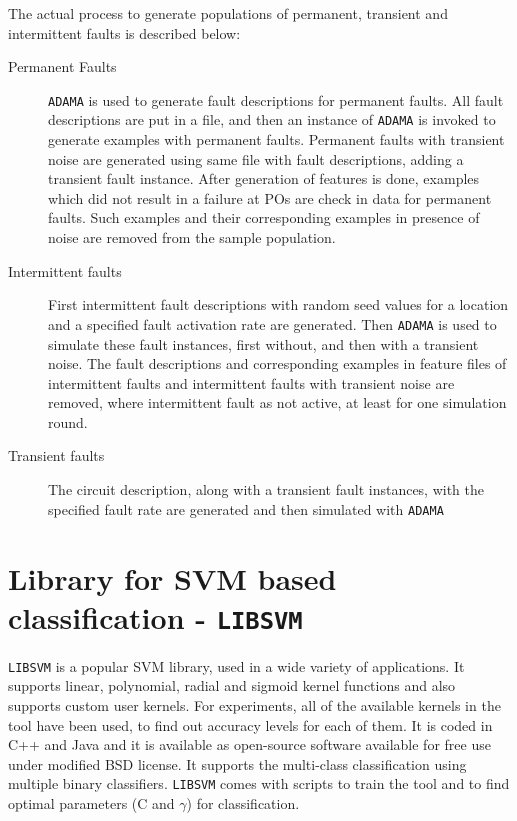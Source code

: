 The actual process to generate populations of permanent, transient and intermittent faults is described below:

\begin{description}
  \item[Permanent Faults] \texttt{ADAMA} is used to generate fault descriptions for permanent faults. All fault descriptions are put in a file, and then an instance of \texttt{ADAMA} is invoked to generate examples with permanent faults. Permanent faults with transient noise are generated using same file with fault descriptions, adding a transient fault instance. After generation of features is done, examples which did not result in a failure at POs are check in data for permanent faults. Such examples and their corresponding examples in presence of noise are removed from the sample population.

  \item[Intermittent faults] First intermittent fault descriptions with random seed values for a location and a specified fault activation rate are generated. Then \texttt{ADAMA} is used to simulate these fault instances, first without, and then with a transient noise. The fault descriptions and corresponding examples in feature files of intermittent faults and intermittent faults with transient noise are removed, where intermittent fault as not active, at least for one simulation round.

  \item[Transient faults] The circuit description, along with a transient fault instances, with the specified fault rate are generated and then simulated with \texttt{ADAMA}

\end{description}

\section{Library for SVM based classification - \texttt{LIBSVM}}
\label{sec:libsvm}
\texttt{LIBSVM} \cite{Chang2011} is a popular SVM library, used in a wide variety of applications. It supports linear, polynomial, radial and sigmoid kernel functions and also supports custom user kernels. For experiments, all of the available kernels in the tool have been used, to find out accuracy levels for each of them. It is coded in C++ and Java and it is available as open-source software available for free use under modified BSD license. It supports the multi-class classification using multiple binary classifiers. \texttt{LIBSVM} comes with scripts to train the tool and to find optimal parameters (C and $\gamma$) for classification.

